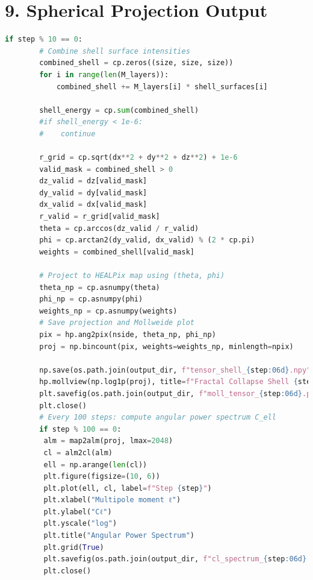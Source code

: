 \section*{9. Spherical Projection Output}
\begin{lstlisting}[language=Python]
 if step % 10 == 0:
        # Combine shell surface intensities
        combined_shell = cp.zeros((size, size, size))
        for i in range(len(M_layers)):
            combined_shell += M_layers[i] * shell_surfaces[i]

        shell_energy = cp.sum(combined_shell)
        #if shell_energy < 1e-6:
        #    continue

        r_grid = cp.sqrt(dx**2 + dy**2 + dz**2) + 1e-6
        valid_mask = combined_shell > 0
        dz_valid = dz[valid_mask]
        dy_valid = dy[valid_mask]
        dx_valid = dx[valid_mask]
        r_valid = r_grid[valid_mask]
        theta = cp.arccos(dz_valid / r_valid)
        phi = cp.arctan2(dy_valid, dx_valid) % (2 * cp.pi)
        weights = combined_shell[valid_mask]
   
        # Project to HEALPix map using (theta, phi)
        theta_np = cp.asnumpy(theta)
        phi_np = cp.asnumpy(phi)
        weights_np = cp.asnumpy(weights)
        # Save projection and Mollweide plot
        pix = hp.ang2pix(nside, theta_np, phi_np)
        proj = np.bincount(pix, weights=weights_np, minlength=npix)
        
        np.save(os.path.join(output_dir, f"tensor_shell_{step:06d}.npy"), proj)
        hp.mollview(np.log1p(proj), title=f"Fractal Collapse Shell {step}", cmap="inferno", cbar=False)
        plt.savefig(os.path.join(output_dir, f"moll_tensor_{step:06d}.png"))
        plt.close()
        # Every 100 steps: compute angular power spectrum C_ell
        if step % 100 == 0:
         alm = map2alm(proj, lmax=2048)
         cl = alm2cl(alm)
         ell = np.arange(len(cl))
         plt.figure(figsize=(10, 6))
         plt.plot(ell, cl, label=f"Step {step}")
         plt.xlabel("Multipole moment ℓ")
         plt.ylabel("Cℓ")
         plt.yscale("log")
         plt.title("Angular Power Spectrum")
         plt.grid(True)
         plt.savefig(os.path.join(output_dir, f"cl_spectrum_{step:06d}.png"))
         plt.close()
\end{lstlisting}

